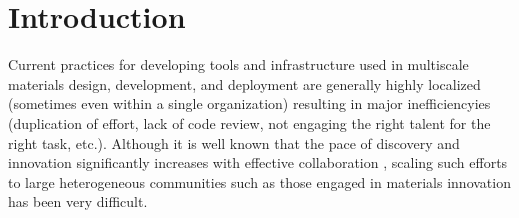 \documentclass{bmcart}
\begin{document}

\section{Introduction}







Current practices for developing tools and infrastructure used in multiscale materials design, development, and deployment are generally highly localized (sometimes even within a single organization) resulting in major inefficiencyies (duplication of effort, lack of code review, not engaging the right talent for the right task, etc.). Although it is well known that the pace of discovery and innovation  significantly increases with effective collaboration \cite{sawhney2005collaborating, edwards2009open, bayne2008interdisciplinary, boudreau2010open}, scaling such efforts to large heterogeneous communities such as those engaged in materials innovation has been very difficult.
\end{document}
